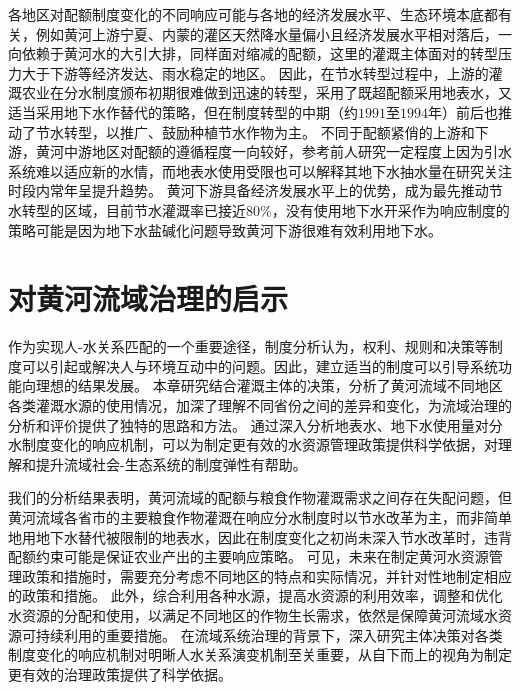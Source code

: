 各地区对配额制度变化的不同响应可能与各地的经济发展水平、生态环境本底都有关，例如黄河上游宁夏、内蒙的灌区天然降水量偏小且经济发展水平相对落后，一向依赖于黄河水的大引大排，同样面对缩减的配额，这里的灌溉主体面对的转型压力大于下游等经济发达、雨水稳定的地区。
因此，在节水转型过程中，上游的灌溉农业在分水制度颁布初期很难做到迅速的转型，采用了既超配额采用地表水，又适当采用地下水作替代的策略，但在制度转型的中期（约$1991$至$1994$年）前后也推动了节水转型，以推广、鼓励种植节水作物为主。
不同于配额紧俏的上游和下游，黄河中游地区对配额的遵循程度一向较好，参考前人研究一定程度上因为引水系统难以适应新的水情，而地表水使用受限也可以解释其地下水抽水量在研究关注时段内常年呈提升趋势。
黄河下游具备经济发展水平上的优势，成为最先推动节水转型的区域，目前节水灌溉率已接近$80\%$，没有使用地下水开采作为响应制度的策略可能是因为地下水盐碱化问题导致黄河下游很难有效利用地下水。

\section{对黄河流域治理的启示}

作为实现人-水关系匹配的一个重要途径，制度分析认为，权利、规则和决策等制度可以引起或解决人与环境互动中的问题。因此，建立适当的制度可以引导系统功能向理想的结果发展。
本章研究结合灌溉主体的决策，分析了黄河流域不同地区各类灌溉水源的使用情况，加深了理解不同省份之间的差异和变化，为流域治理的分析和评价提供了独特的思路和方法。
通过深入分析地表水、地下水使用量对分水制度变化的响应机制，可以为制定更有效的水资源管理政策提供科学依据，对理解和提升流域社会-生态系统的制度弹性有帮助。

我们的分析结果表明，黄河流域的配额与粮食作物灌溉需求之间存在失配问题，但黄河流域各省市的主要粮食作物灌溉在响应分水制度时以节水改革为主，而非简单地用地下水替代被限制的地表水，因此在制度变化之初尚未深入节水改革时，违背配额约束可能是保证农业产出的主要响应策略。
可见，未来在制定黄河水资源管理政策和措施时，需要充分考虑不同地区的特点和实际情况，并针对性地制定相应的政策和措施。
此外，综合利用各种水源，提高水资源的利用效率，调整和优化水资源的分配和使用，以满足不同地区的作物生长需求，依然是保障黄河流域水资源可持续利用的重要措施。
在流域系统治理的背景下，深入研究主体决策对各类制度变化的响应机制对明晰人水关系演变机制至关重要，从自下而上的视角为制定更有效的治理政策提供了科学依据。


